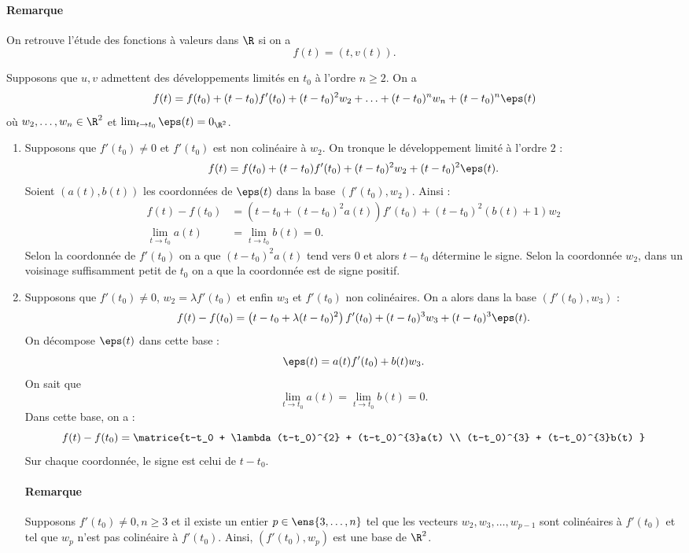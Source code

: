 \paragraph{Remarque}On retrouve l'étude des fonctions à valeurs dans $\R$ si on a \[f(t) = (t,v(t)). \]

Supposons que $u,v$ admettent des développements limités en $t_0$ à l'ordre $n\geq 2$. On a \[f(t) = f(t_0) + (t-t_0)f'(t_0) + (t-t_0)^{2}w_2 + \ldots + (t-t_0)^{n}w_n + (t-t_0)^{n}\eps(t)\]où $w_2,\ldots,w_n\in \R^{2}$ et $\lim_{t\to t_0}\eps(t) = 0_{\R^{2}}$.
\begin{enumerate}
\item Supposons que $f'(t_0)\neq 0$ et $f'(t_0)$ est non colinéaire à $w_2$. On tronque le développement limité à l'ordre $2$  : \[ f(t) = f(t_0) + (t-t_0)f'(t_0) + (t-t_0)^{2}w_2 + (t-t_0)^{2}\eps(t).\]Soient $(a(t),b(t))$ les coordonnées de $\eps(t)$ dans la base $(f'(t_0),w_2)$. Ainsi :
\begin{align*}
f(t) - f(t_0) &= \left(t-t_0 + (t-t_0)^{2}a(t)\right)f'(t_0) + (t-t_0)^{2}(b(t) +1)w_2\\
\lim_{t\to t_0} a(t) &= \lim_{t\to t_0} b(t) = 0.
\end{align*}
Selon la coordonnée de $f'(t_0)$ on a que $(t-t_0)^{2}a(t)$ tend vers $0$ et alors $t-t_0$ détermine le signe. Selon la coordonnée $w_2$, dans un voisinage suffisamment petit de $t_0$ on a que la coordonnée est de signe positif.
\item Supposons que $f'(t_0)\neq 0$, $w_2 = \lambda f'(t_0)$ et enfin $w_3$ et $f'(t_0)$ non colinéaires. On a alors dans la base $(f'(t_0),w_3)$ : \[f(t) - f(t_0) = \left(t-t_0 + \lambda(t-t_0)^{2}\right)f'(t_0) + (t-t_0)^{3}w_3 + (t-t_0)^{3}\eps(t). \]
On décompose $\eps(t)$ dans cette base : \[\eps(t) = a(t) f'(t_0) + b(t) w_3.\]On sait que \[ \lim_{t\to t_0}a(t) = \lim_{t\to t_0}b(t) = 0.\]
Dans cette base, on a : \[ f(t) - f(t_0) = \matrice{t-t_0 + \lambda(t-t_0)^{2} + (t-t_0)^{3}a(t) \\ (t-t_0)^{3} + (t-t_0)^{3}b(t) }\]
Sur chaque coordonnée, le signe est celui de $t-t_0$.


\paragraph{Remarque}Supposons $f'(t_0)\neq 0, n\geq 3$ et il existe un entier $p\in\ens{3,\ldots,n}$ tel que les vecteurs $w_2,w_3,\ldots,w_{p-1}$ sont colinéaires à $f'(t_0)$ et tel que $w_p$ n'est pas colinéaire à $f'(t_0)$. Ainsi, $(f'(t_0),w_p)$ est une base de $\R^{2}$.


\end{enumerate}
